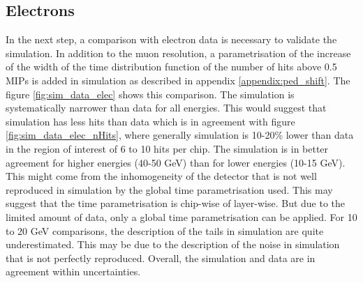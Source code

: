 \subsection{Electrons}

In the next step, a comparison with electron data is necessary to validate the simulation. In addition to the muon resolution, a parametrisation of the increase of the width of the time distribution function of the number of hits above 0.5 MIPs is added in simulation as described in appendix \ref{appendix:ped_shift}. The figure \ref{fig:sim_data_elec} shows this comparison. The simulation is systematically narrower than data for all energies. This would suggest that simulation has less hits than data which is in agreement with figure \ref{fig:sim_data_elec_nHits}, where generally simulation is 10-20\% lower than data in the region of interest of 6 to 10 hits per chip. The simulation is in better agreement for higher energies (40-50 GeV) than for lower energies (10-15 GeV). This might come from the inhomogeneity of the detector that is not well reproduced in simulation by the global time parametrisation used. This may suggest that the time parametrisation is chip-wise of layer-wise. But due to the limited amount of data, only a global time parametrisation can be applied. For 10 to 20 GeV comparisons, the description of the tails in simulation are quite underestimated. This may be due to the description of the noise in simulation that is not perfectly reproduced. Overall, the simulation and data are in agreement within uncertainties.

